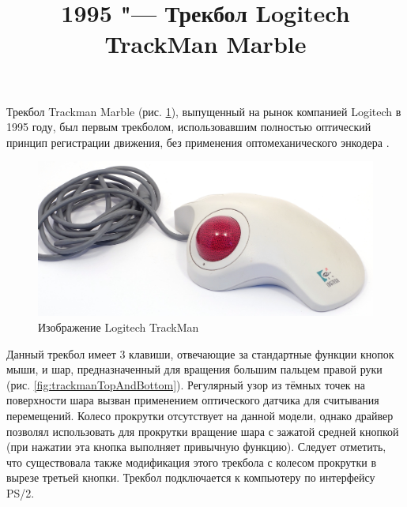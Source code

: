 \documentclass[11pt, a4paper]{article}
\begin{document}
\title{1995 "--- Трекбол Logitech TrackMan Marble}
\date{}
\maketitle

Трекбол Trackman Marble (рис. \ref{fig:trackman}), выпущенный на рынок компанией Logitech в 1995 году, был первым трекболом, использовавшим полностью оптический принцип регистрации движения, без применения оптомеханического энкодера \cite{logitech25}.

\begin{figure}[h]
    \centering
    \includegraphics[scale=0.4]{1995_logitech_trackman/pic_60.jpg}
    \caption{Изображение Logitech TrackMan}
    \label{fig:trackman}
\end{figure}

Данный трекбол имеет 3 клавиши, отвечающие за стандартные функции кнопок мыши, и шар, предназначенный для вращения большим пальцем правой руки (рис. \ref{fig:trackmanTopAndBottom}). Регулярный узор из тёмных точек на поверхности шара вызван применением оптического датчика для считывания перемещений. Колесо прокрутки отсутствует на данной модели, однако драйвер позволял использовать для прокрутки вращение шара с зажатой средней кнопкой (при нажатии эта кнопка выполняет привычную функцию). Следует отметить, что существовала также модификация этого трекбола с колесом прокрутки в вырезе третьей кнопки. Трекбол подключается к компьютеру по интерфейсу PS/2.
\end{document}
